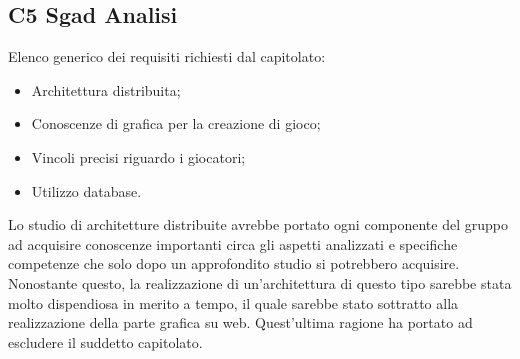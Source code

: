 \subsection{C5 Sgad Analisi}
Elenco generico dei requisiti richiesti dal capitolato:
\begin{itemize} 
\item Architettura distribuita;
\item Conoscenze di grafica per la creazione di gioco;
\item Vincoli precisi riguardo i giocatori;
\item Utilizzo database.
\end{itemize}
Lo studio di architetture distribuite avrebbe portato ogni componente del gruppo ad acquisire conoscenze importanti circa gli aspetti analizzati e specifiche competenze che solo dopo un approfondito studio si potrebbero acquisire. Nonostante questo, la realizzazione di un'architettura di questo tipo sarebbe stata molto dispendiosa in merito a tempo, il quale sarebbe stato sottratto alla realizzazione della parte grafica su web. Quest'ultima ragione ha portato ad escludere il suddetto capitolato.\\